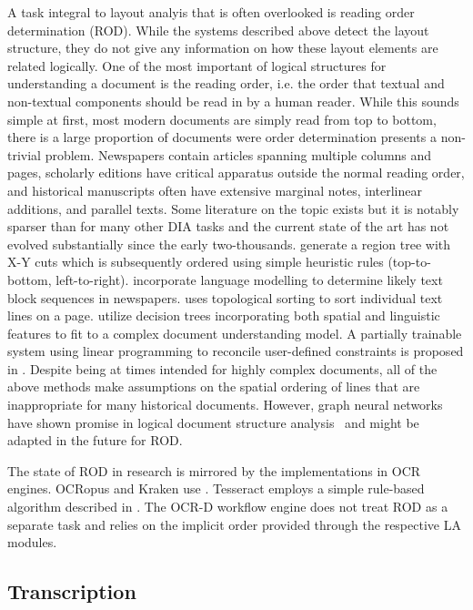 A task integral to layout analyis that is often overlooked is reading order
determination (ROD). While the systems described above detect the layout
structure, they do not give any information on how these layout elements are
related logically. One of the most important of logical structures for
understanding a document is the reading order, i.e. the order that textual and
non-textual components should be read in by a human reader. While this sounds
simple at first, most modern documents are simply read from top to bottom,
there is a large proportion of documents were order determination presents a
non-trivial problem. Newspapers contain articles spanning multiple columns and
pages, scholarly editions have critical apparatus outside the normal reading
order, and historical manuscripts often have extensive marginal notes,
interlinear additions, and parallel texts.  Some literature on the topic exists
but it is notably sparser than for many other DIA tasks and the current state
of the art has not evolved substantially since the early two-thousands.
\cite{nagy1984hierarchical,ishitani2003document,meunier2005optimized} generate
a region tree with X-Y cuts which is subsequently ordered using simple
heuristic rules (top-to-bottom, left-to-right). \cite{Gao} incorporate language
modelling to determine likely text block sequences in newspapers.
\cite{Breuel03highperformance} uses topological sorting to sort individual text
lines on a page. \cite{AielloIJDAR2002} utilize decision trees incorporating
both spatial and linguistic features to fit to a complex document understanding
model. A partially trainable system using linear programming to reconcile
user-defined constraints is proposed in \cite{malerba2008machine}. Despite being at
times intended for highly complex documents, all of the above methods make
assumptions on the spatial ordering of lines that are inappropriate for many
historical documents. However, graph neural networks have shown promise in
logical document structure analysis~\cite{dejean2019versatile} and might be
adapted in the future for ROD.

The state of ROD in research is mirrored by the implementations in OCR engines.
OCRopus and Kraken use \cite{Breuel03highperformance}. Tesseract employs a
simple rule-based algorithm described in \cite{5277715}. The OCR-D workflow
engine does not treat ROD as a separate task and relies on the implicit order
provided through the respective LA modules.

\subsection{Transcription}

